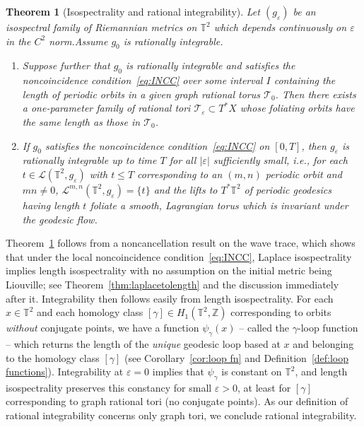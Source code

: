 \documentclass[11pt,letterpaper,oneside]{amsart}
\newcommand{\Z}{\mathbb{Z}}
\newcommand{\T}{\mathbb{T}}
\renewcommand{\epsilon}{\varepsilon}
\newtheorem{theo}{Theorem}[section]
\theoremstyle{definition}
\theoremstyle{remark}
\newcommand{\eps}{\varepsilon}
\theoremstyle{definition}
\theoremstyle{remark}
\newcommand{\CL}{\mathcal{L}}
\newcommand{\CT}{\mathcal{T}}
\begin{document}
\begin{theo}[Isospectrality and rational integrability]\label{thm:isospec implies RI}
    Let $(g_\epsilon)$ be an isospectral family of Riemannian metrics on $\T^2$ which depends continuously on $\epsilon$ in the $C^2$ norm.{Assume $g_0$ is rationally integrable}.
    \begin{enumerate}
        \item Suppose further that $g_0$ is rationally integrable and satisfies the noncoincidence condition~\eqref{eq:INCC} over some interval $I$ containing the length of periodic orbits in a given graph rational torus $\CT_0$. Then there exists a one-parameter family of rational tori $\CT_\eps \subset T^*X$ whose foliating orbits have the same length as those in $\CT_0$.
        \item If $g_0$ satisfies the noncoincidence condition~\eqref{eq:INCC} on $[0,T]$, then $g_\epsilon$ is rationally integrable up to time $T$ for all $|\epsilon|$ sufficiently small, i.e., for each $t \in \CL(\T^2,g_\eps)$ with $t \leq T$ corresponding to an $(m,n)$ periodic orbit and $mn \neq 0$, $\CL^{m,n}(\T^2,g_\eps) =\{t\}$ and the lifts to $T^*\T^2$ of periodic geodesics having length $t$ foliate a smooth, Lagrangian torus which is invariant under the geodesic flow.
    \end{enumerate}
\end{theo}
Theorem~\ref{thm:isospec implies RI} follows from a noncancellation result on the wave trace, which shows that under the local noncoincidence condition~\eqref{eq:INCC}, Laplace isospectrality implies length isospectrality with no assumption on the initial metric being Liouville; see Theorem~\ref{thm:laplacetolength} and the discussion immediately after it. Integrability then follows easily from length isospectrality. For each $x \in \T^2$ and each homology class $[\gamma] \in H_1(\T^2,\Z)$ corresponding to orbits \textit{without} conjugate points, we have a function  $\psi_\gamma(x)$ -- called the $\gamma$-loop function -- which returns the length of the \textit{unique} geodesic loop based at $x$ and belonging to the homology class $[\gamma]$ (see Corollary~\ref{cor:loop fn} and Definition~\ref{def:loop functions}). Integrability at $\eps = 0$ implies that $\psi_\gamma$ is constant on $\T^2$, and length isospectrality preserves this constancy for small $\eps > 0$, at least for $[\gamma]$ corresponding to graph rational tori (no conjugate points). As our definition of rational integrability concerns only graph tori, we conclude {rational} integrability.
\end{document}
